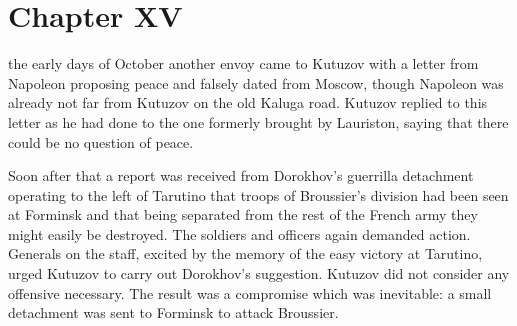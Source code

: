 
\chapter*{Chapter XV} \ifaudio {}
\fi

 the early days of October another 
envoy came to Kutuzov with a
letter from Napoleon proposing peace and falsely dated from
Moscow, though Napoleon was already not far from Kutuzov on the
old Kaluga road.  Kutuzov replied to this letter as he had done
to the one formerly brought by Lauriston, saying that there could
be no question of peace.

Soon after that a report was received from Dorokhov's guerrilla
detachment operating to the left of Tarutino that troops of
Broussier's division had been seen at Forminsk and that being
separated from the rest of the French army they might easily be
destroyed. The soldiers and officers again demanded
action. Generals on the staff, excited by the memory of the easy
victory at Tarutino, urged Kutuzov to carry out Dorokhov's
suggestion. Kutuzov did not consider any offensive necessary.
The result was a compromise which was inevitable: a small
detachment was sent to Forminsk to attack Broussier.

